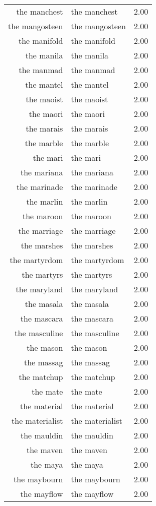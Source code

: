 \begin{table}[ht]
\begin{tabular}{rlr}
  the manchest & the manchest & 2.00 \\ 
  the mangosteen & the mangosteen & 2.00 \\ 
  the manifold & the manifold & 2.00 \\ 
  the manila & the manila & 2.00 \\ 
  the manmad & the manmad & 2.00 \\ 
  the mantel & the mantel & 2.00 \\ 
  the maoist & the maoist & 2.00 \\ 
  the maori & the maori & 2.00 \\ 
  the marais & the marais & 2.00 \\ 
  the marble & the marble & 2.00 \\ 
  the mari & the mari & 2.00 \\ 
  the mariana & the mariana & 2.00 \\ 
  the marinade & the marinade & 2.00 \\ 
  the marlin & the marlin & 2.00 \\ 
  the maroon & the maroon & 2.00 \\ 
  the marriage & the marriage & 2.00 \\ 
  the marshes & the marshes & 2.00 \\ 
  the martyrdom & the martyrdom & 2.00 \\ 
  the martyrs & the martyrs & 2.00 \\ 
  the maryland & the maryland & 2.00 \\ 
  the masala & the masala & 2.00 \\ 
  the mascara & the mascara & 2.00 \\ 
  the masculine & the masculine & 2.00 \\ 
  the mason & the mason & 2.00 \\ 
  the massag & the massag & 2.00 \\ 
  the matchup & the matchup & 2.00 \\ 
  the mate & the mate & 2.00 \\ 
  the material & the material & 2.00 \\ 
  the materialist & the materialist & 2.00 \\ 
  the mauldin & the mauldin & 2.00 \\ 
  the maven & the maven & 2.00 \\ 
  the maya & the maya & 2.00 \\ 
  the maybourn & the maybourn & 2.00 \\ 
  the mayflow & the mayflow & 2.00 \\ 

\end{tabular}
\end{table}
